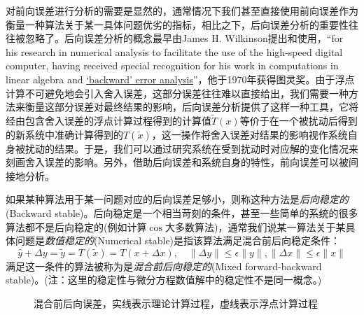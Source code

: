 \documentclass[a4paper,10pt]{ctexart}
\begin{document}
对前向误差进行分析的需要是显然的，通常情况下我们甚至直接使用前向误差作为衡量一种算法关于某一具体问题优劣的指标，相比之下，后向误差分析的重要性往往被忽略了。后向误差分析的概念最早由James H. Wilkinson提出和使用，“for his research in numerical analysis to facilitate the use of the high-speed digital computer, having received special recognition for his work in computations in linear algebra and \underline{‘backward’ error analysis}”，他于1970年获得图灵奖。由于浮点计算不可避免地会引入舍入误差，这部分误差往往难以直接给出，我们需要一种方法来衡量这部分误差对最终结果的影响，后向误差分析提供了这样一种工具，它将经由包含舍入误差的浮点计算过程得到的计算值$ \tilde{T}(x) $等价于在一个被扰动后得到的新系统中准确计算得到的$ T(\tilde{x}) $，这一操作将舍入误差对结果的影响视作系统自身被扰动的结果。于是，我们可以通过研究系统在受到扰动时对应解的变化情况来刻画舍入误差的影响。另外，借助后向误差和系统自身的特性，前向误差可以被间接地分析。

如果某种算法用于某一问题对应的后向误差足够小，则称这种方法是\emph{后向稳定的}(Backward stable)。后向稳定是一个相当苛刻的条件，甚至一些简单的系统的很多算法都不是后向稳定的(例如计算$ \cos $大多数算法)，通常我们说某一算法关于某具体问题是\emph{数值稳定的}(Numerical stable)是指该算法满足混合前后向稳定条件：
\begin{equation}
    \hat{y} + \Delta y = \tilde{y} = T(\tilde{x}) = T(x+\Delta x),\quad \| \Delta y \|\leqslant \epsilon \| y \| , \| \Delta x \|\leqslant \epsilon \| x \|
\end{equation}
满足这一条件的算法被称为是\emph{混合前后向稳定的}(Mixed forward-backward stable)。(注：这里的稳定性与微分方程数值解中的稳定性不是同一概念。)

\begin{figure}[htpb]
    \centering
    \caption{混合前后向误差，实线表示理论计算过程，虚线表示浮点计算过程}
    \label{MixBackward-Forward}
\end{figure}
\end{document}
